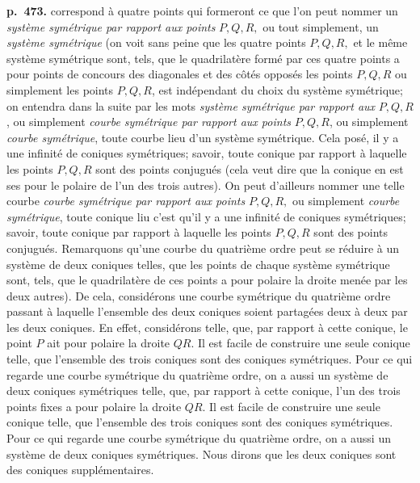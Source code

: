 \documentclass[11pt]{article}
\begin{document}
\bigskip
\noindent\textbf{p.~473.} correspond \`a quatre points qui formeront ce que l'on peut nommer un \textit{syst\`eme sym\'etrique par rapport aux points} $P, Q, R,$ ou tout simplement, un \textit{syst\`eme sym\'etrique} (on voit sans peine que les quatre points $P, Q, R,$ et le m\^eme syst\`eme sym\'etrique sont, tels, que le quadrilat\`ere form\'e par ces quatre points a pour points de concours des diagonales et des c\^ot\'es oppos\'es les points $P, Q, R$ ou simplement les points $P, Q, R$, est ind\'ependant du choix du syst\`eme sym\'etrique; on entendra dans la suite par les mots \textit{syst\`eme sym\'etrique par rapport aux} $P, Q, R$, ou simplement \textit{courbe sym\'etrique par rapport aux points} $P, Q, R$, ou simplement \textit{courbe sym\'etrique}, toute courbe lieu d'un syst\`eme sym\'etrique. Cela pos\'e, il y a une infinit\'e de coniques sym\'etriques; savoir, toute conique par rapport \`a laquelle les points $P, Q, R$ sont des points conjugu\'es (cela veut dire que la conique en est ses pour le polaire de l'un des trois autres). On peut d'ailleurs nommer une telle courbe \textit{courbe sym\'etrique par rapport aux points} $P, Q, R,$ ou simplement \textit{courbe sym\'etrique}, toute conique liu c'est qu'il y a une infinit\'e de coniques sym\'etriques; savoir, toute conique par rapport \`a laquelle les points $P, Q, R$ sont des points conjugu\'es. Remarquons qu'une courbe du quatri\`eme ordre peut se r\'eduire \`a un syst\`eme de deux coniques telles, que les points de chaque syst\`eme sym\'etrique sont, tels, que le quadrilat\`ere de ces points a pour polaire la droite men\'ee par les deux autres). De cela, consid\'erons une courbe sym\'etrique du quatri\`eme ordre passant \`a laquelle l'ensemble des deux coniques soient partag\'ees deux \`a deux par les deux coniques. En effet, consid\'erons telle, que, par rapport \`a cette conique, le point $P$ ait pour polaire la droite $QR$. Il est facile de construire une seule conique telle, que l'ensemble des trois coniques sont des coniques sym\'etriques. Pour ce qui regarde une courbe sym\'etrique du quatri\`eme ordre, on a aussi un syst\`eme de deux coniques sym\'etriques telle, que, par rapport \`a cette conique, l'un des trois points fixes a pour polaire la droite $QR$. Il est facile de construire une seule conique telle, que l'ensemble des trois coniques sont des coniques sym\'etriques. Pour ce qui regarde une courbe sym\'etrique du quatri\`eme ordre, on a aussi un syst\`eme de deux coniques sym\'etriques. Nous dirons que les deux coniques sont des coniques suppl\'ementaires.
\end{document}

